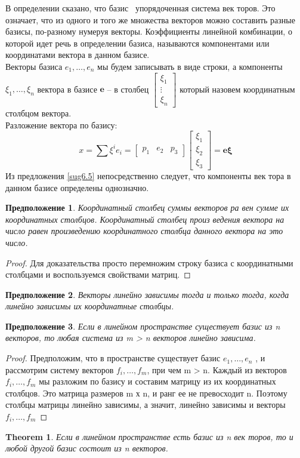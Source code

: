 \documentclass[11pt; a4paper]{report}
\theoremstyle{plain} %
\newtheorem{theorem}{Theorem}
\newtheorem{sug}{Предположение}[section]
\theoremstyle{defenition}
\theoremstyle{remark}
\begin{document}
В определении сказано, что базис \textemdash\  упорядоченная система век­ торов. Это означает,
 что из одного и того же множества векторов можно составить разные базисы, по-разному нумеруя векторы.
Коэффициенты линейной комбинации, о которой идет речь
в определении базиса, называются компонентами или координатами вектора в данном базисе.\\
Векторы базиса $e_1, \ldots, e_n$ мы будем записывать в виде строки, 
а компоненты $\xi_1, \ldots, \xi_n$ вектора в базисе $\boldsymbol{e}$ -- в столбец $\begin{bmatrix} \xi_1 \\  \vdots \\ \xi_n \end{bmatrix}$ который назовем координатным столбцом вектора.\\
Разложение вектора по  базису:
 \begin{equation*}
 x = \sum \xi^ie_i =  \begin{bmatrix} p_1 &  e_2 & p_3 \end{bmatrix}  
 \begin{bmatrix} \xi_1 \\  \xi_2 \\ \xi_3 \end{bmatrix} = \boldsymbol{ e\xi}
 \end{equation*}
Из предложения \ref{sug6.5} непосредственно следует, что компоненты век­ тора в данном базисе определены однозначно.

\begin{sug}\label{sug6.6}
Координатный столбец суммы векторов ра­ вен сумме их координатных столбцов. Координатный столбец произ­ ведения вектора на число равен произведению координатного столбца данного вектора на это число.
\end{sug}
\begin{proof}
Для доказательства просто перемножим строку базиса с координатными столбцами и воспользуемся свойствами матриц.
\end{proof}

\begin{sug}\label{sug6.7}
Векторы линейно зависимы тогда и только тогда, когда линейно зависимы их координатные столбцы.
\end{sug}

\begin{sug}\label{sug6.8}
Если в линейном пространстве существует базис из n векторов, то любая система из m > n векторов линейно
зависима.
\end{sug}
\begin{proof}
Предположим, что в пространстве сущест­вует базис $e_1, \ldots, e_n$ , и рассмотрим систему векторов 
$ f_i , \ldots, f_m$, при­ чем m > n. Каждый из векторов $f_i , \ldots, f_m$ мы разложим по базису и составим матрицу из их координатных столбцов. Это матрица раз­меров m х n, и ранг ее не превосходит n. Поэтому столбцы матрицы линейно зависимы, а значит, линейно зависимы и векторы $ f_i , \ldots, f_m$
\end{proof}
\begin{theorem}\label{t6.1}
Если в линейном пространстве есть базис из n век­ торов, то и любой другой базис состоит из n векторов.
\end{theorem}
\end{document}
